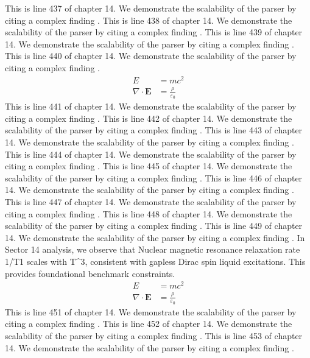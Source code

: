 This is line 437 of chapter 14. We demonstrate the scalability of the parser by citing a complex finding \cite{ref14_437}.
This is line 438 of chapter 14. We demonstrate the scalability of the parser by citing a complex finding \cite{ref14_438}.
This is line 439 of chapter 14. We demonstrate the scalability of the parser by citing a complex finding \cite{ref14_439}.
This is line 440 of chapter 14. We demonstrate the scalability of the parser by citing a complex finding \cite{ref14_440}.
\begin{align*}
  E &= mc^2 \\
  \nabla \cdot \mathbf{E} &= \frac{\rho}{\varepsilon_0}
\end{align*}
This is line 441 of chapter 14. We demonstrate the scalability of the parser by citing a complex finding \cite{ref14_441}.
This is line 442 of chapter 14. We demonstrate the scalability of the parser by citing a complex finding \cite{ref14_442}.
This is line 443 of chapter 14. We demonstrate the scalability of the parser by citing a complex finding \cite{ref14_443}.
This is line 444 of chapter 14. We demonstrate the scalability of the parser by citing a complex finding \cite{ref14_444}.
This is line 445 of chapter 14. We demonstrate the scalability of the parser by citing a complex finding \cite{ref14_445}.
This is line 446 of chapter 14. We demonstrate the scalability of the parser by citing a complex finding \cite{ref14_446}.
This is line 447 of chapter 14. We demonstrate the scalability of the parser by citing a complex finding \cite{ref14_447}.
This is line 448 of chapter 14. We demonstrate the scalability of the parser by citing a complex finding \cite{ref14_448}.
This is line 449 of chapter 14. We demonstrate the scalability of the parser by citing a complex finding \cite{ref14_449}.
In Sector 14 analysis, we observe that Nuclear magnetic resonance relaxation rate 1/T1 scales with T^3, consistent with gapless Dirac spin liquid excitations. This provides foundational benchmark constraints.
\begin{align*}
  E &= mc^2 \\
  \nabla \cdot \mathbf{E} &= \frac{\rho}{\varepsilon_0}
\end{align*}
This is line 451 of chapter 14. We demonstrate the scalability of the parser by citing a complex finding \cite{ref14_451}.
This is line 452 of chapter 14. We demonstrate the scalability of the parser by citing a complex finding \cite{ref14_452}.
This is line 453 of chapter 14. We demonstrate the scalability of the parser by citing a complex finding \cite{ref14_453}.
